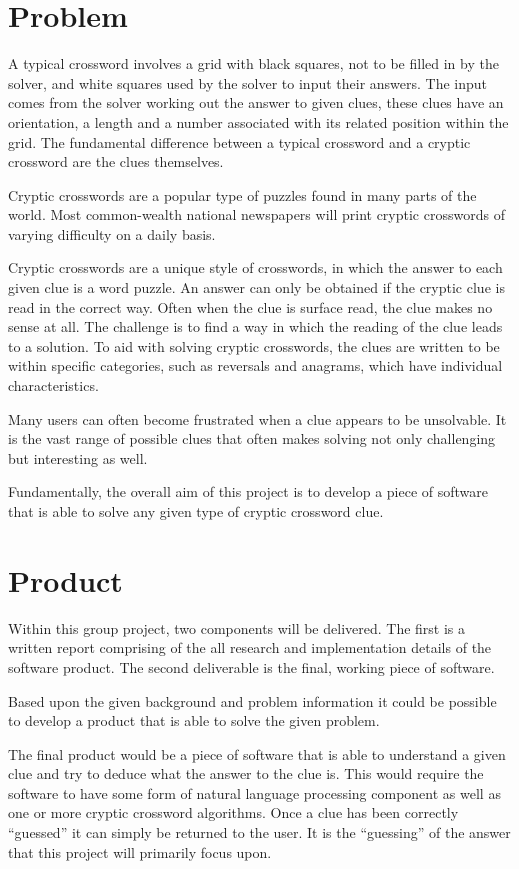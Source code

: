 \section{Problem}

A typical crossword involves a grid with black squares, not to be filled in by the
 solver, and white squares used by the solver to input their answers. The input
 comes from the solver working out the answer to given clues, these clues have
 an orientation, a length and a number associated with its related position within
 the grid. The fundamental difference between a typical crossword and a cryptic
 crossword are the clues themselves. 

Cryptic crosswords are a popular type of puzzles found in many parts of the
 world. Most common-wealth national newspapers will print cryptic crosswords 
of varying difficulty on a daily basis.

Cryptic crosswords are a unique style of crosswords, in which the answer to 
each given clue is a word puzzle. An answer can only be obtained if the cryptic
 clue is read in the correct way. Often when the clue is surface read, the clue
 makes no sense at all. The challenge is to find a way in which the reading of 
the clue leads to a solution. To aid with solving cryptic crosswords, the clues
 are written to be within specific categories, such as reversals and anagrams,
 which have individual characteristics. 

Many users can often become frustrated when a clue appears to be unsolvable. It
is the vast range of possible clues that often makes solving not only 
challenging but interesting as well.

Fundamentally, the overall aim of this project is to develop a piece of 
software that is able to solve any given type of cryptic crossword clue.


\section{Product}
Within this group project, two components will be delivered. The first is a 
written report comprising of the all research and implementation details of 
the software product. The second deliverable is the final, working piece of software.

Based upon the given background and problem information it could be possible
 to develop a product that is able to solve the given problem.

The final product would be a piece of software that is able to understand 
a given clue and try to deduce what the answer to the clue is. This would require
 the software to have some form of natural language processing component 
as well as one or more cryptic crossword algorithms. Once a clue has been
 correctly ``guessed'' it can simply be returned to the 
user. It is the ``guessing'' of the answer that this project will primarily 
focus upon.

